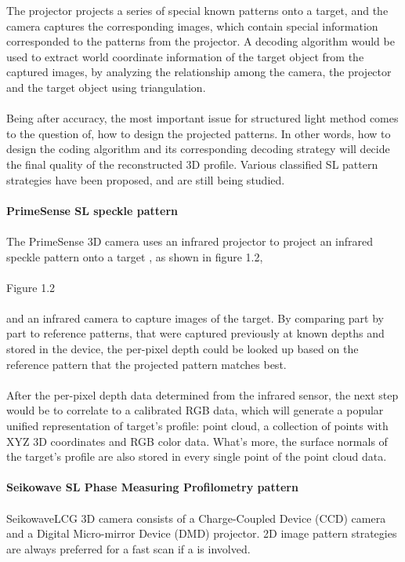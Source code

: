 The projector projects a series of special known patterns onto a target, and the camera captures the corresponding images, which contain special information corresponded to the patterns from the projector. A decoding algorithm would be used to extract world coordinate information of the target object from the captured images, by analyzing the relationship among the camera, the projector and the target object using triangulation.\\
\\
Being after accuracy, the most important issue for structured light method comes to the question of, how to design the projected patterns. In other words, how to design the coding algorithm and its corresponding decoding strategy will decide the final quality of the reconstructed 3D profile. Various classified SL pattern strategies have been proposed, and are still being studied.
\\
\\\textbf{PrimeSense SL speckle pattern}\\\\
The PrimeSense 3D camera uses an infrared projector to project an infrared speckle pattern onto a target 
, as shown in figure 1.2,%
\\\\Figure 1.2\\\\
and an infrared camera to capture images of the target. By comparing part by part to reference patterns, that were captured previously at known depths and stored in the device, the per-pixel depth could be looked up based on the reference pattern that the projected pattern matches best. 
\\\\
After the per-pixel depth data determined from the infrared sensor, the next step would be to correlate to a calibrated RGB data, which will generate a popular unified representation of target's profile: point cloud, a collection of points with XYZ 3D coordinates and RGB color data. What's more, the surface normals of the target's profile are also stored in every single point of the point cloud data. 
\\
\\\textbf{Seikowave SL Phase Measuring Profilometry pattern}\\\\%
SeikowaveLCG 3D camera consists of a Charge-Coupled Device (CCD) camera and a Digital Micro-mirror Device (DMD) projector. 2D image pattern strategies are always preferred for a fast scan if a is involved. 
